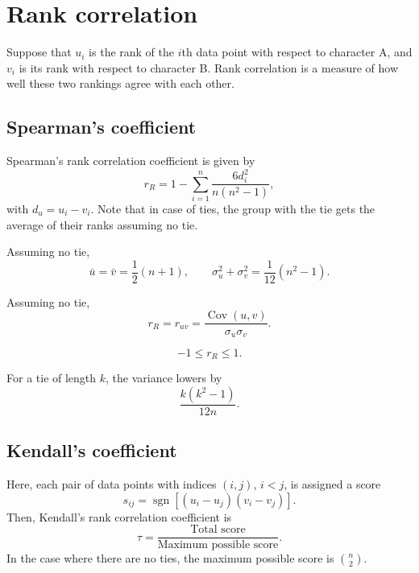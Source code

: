 \documentclass[11pt]{article}
\DeclareMathOperator{\cov}{Cov}
\theoremstyle{definition}
\theoremstyle{remark}
\numberwithin{equation}{section}
\begin{document}
    \section{Rank correlation}

    Suppose that $u_i$ is the rank of the $i$th data point with respect to character
    A, and $v_i$ is its rank with respect to character B. Rank correlation is a
    measure of how well these two rankings agree with each other.

    \subsection{Spearman's coefficient}
    
    Spearman's rank correlation coefficient is given by \[
        r_R = 1 - \sum_{i = 1}^n \frac{6d_i^2}{n(n^2 - 1)},
    \] with $d_u = u_i - v_i$. Note that in case of ties, the group with the tie gets
    the average of their ranks assuming no tie.

    \begin{lemma}
        Assuming no tie, \[
            \bar{u} = \bar{v} = \frac{1}{2}(n + 1), \qquad \sigma^2_u + \sigma^2_v =
            \frac{1}{12}(n^2 - 1).
        \]
    \end{lemma}
    \begin{lemma}
        Assuming no tie, \[
            r_R = r_{uv} = \frac{\cov(u, v)}{\sigma_u \sigma_v}.
        \] 
    \end{lemma}

    \begin{lemma}
        \[
            -1 \leq r_R \leq 1.
        \] 
    \end{lemma}

    \begin{lemma}
        For a tie of length $k$, the variance lowers by \[
            \frac{k(k^2 - 1)}{12n}.
        \] 
    \end{lemma}


    \subsection{Kendall's coefficient}

    Here, each pair of data points with indices $(i, j)$, $i < j$, is assigned a
    score \[
        s_{ij} = \operatorname{sgn}\left[(u_i - u_j)(v_i - v_j)\right].
    \] Then, Kendall's rank correlation coefficient is \[
        \tau = \frac{\text{Total score}}{\text{Maximum possible score}}.
    \] In the case where there are no ties, the maximum possible score is
    $\binom{n}{2}$.
\end{document}

